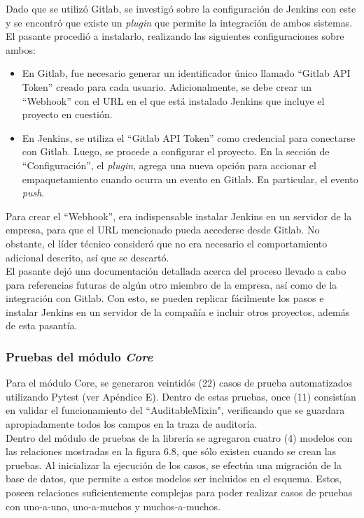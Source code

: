 Dado que se utilizó Gitlab, se investigó sobre la configuración de Jenkins con este y se encontró que existe un \textit{plugin} que permite la integración de ambos sistemas. El pasante procedió a instalarlo, realizando las siguientes configuraciones sobre ambos:

\begin{itemize}
    \item En Gitlab, fue necesario generar un identificador único llamado “Gitlab API Token” creado para cada usuario. Adicionalmente, se debe crear un “Webhook” con el URL en el que está instalado Jenkins que incluye el proyecto en cuestión.
    \item En Jenkins, se utiliza el “Gitlab API Token” como credencial para conectarse con Gitlab. Luego, se procede a configurar el proyecto. En la sección de “Configuración”, el \textit{plugin}, agrega una nueva opción para accionar el empaquetamiento cuando ocurra un evento en Gitlab. En particular, el evento \textit{push}.
\end{itemize}


Para crear el “Webhook”, era indispensable instalar Jenkins en un servidor de la empresa, para que el URL mencionado pueda accederse desde Gitlab. No obstante, el líder técnico consideró que no era necesario el comportamiento adicional descrito, así que se descartó.\\

El pasante dejó una documentación detallada acerca del proceso llevado a cabo para referencias futuras de algún otro miembro de la empresa, así como de la integración con Gitlab. Con esto, se pueden replicar fácilmente los pasos e instalar Jenkins en un servidor de la compañía e incluir otros proyectos, además de esta pasantía.

\subsubsection{Pruebas del módulo \textit{Core}}

Para el módulo Core, se generaron veintidós (22) casos de prueba automatizados utilizando Pytest (ver Apéndice E). Dentro de estas pruebas, once (11) consistían en validar el funcionamiento del “AuditableMixin", verificando que se guardara apropiadamente todos los campos en la traza de auditoría. \\

Dentro del módulo de pruebas de la librería se agregaron cuatro (4) modelos con las relaciones mostradas en la figura 6.8, que sólo existen cuando se crean las pruebas. Al inicializar la ejecución de los casos, se efectúa una migración de la base de datos, que permite a estos modelos ser incluidos en el esquema. Estos, poseen relaciones suficientemente complejas para poder realizar casos de pruebas con uno-a-uno, uno-a-muchos y muchos-a-muchos.

